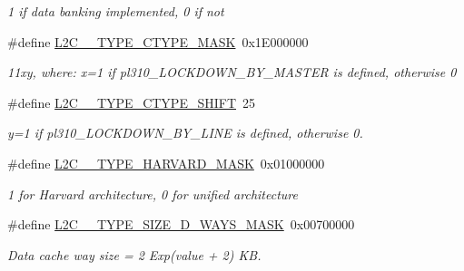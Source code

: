 \begin{DoxyCompactItemize}
\begin{DoxyCompactList}\small\item\em 1 if data banking implemented, 0 if not \end{DoxyCompactList}\item 
\mbox{\label{group__L2C-310__cache_gab3e4bbf537dd9b0520100b3c939e0302}} 
\#define \mbox{\hyperlink{group__L2C-310__cache_gab3e4bbf537dd9b0520100b3c939e0302}{L2\+C\+\_\+\_\+\+T\+Y\+P\+E\+\_\+\+C\+T\+Y\+P\+E\+\_\+\+M\+A\+SK}}~0x1\+E000000
\begin{DoxyCompactList}\small\item\em 11xy, where\+: x=1 if pl310\+\_\+\+L\+O\+C\+K\+D\+O\+W\+N\+\_\+\+B\+Y\+\_\+\+M\+A\+S\+T\+ER is defined, otherwise 0 \end{DoxyCompactList}\item 
\mbox{\label{group__L2C-310__cache_gaea11f2aa0d3382d07500a54f0a64d0ce}} 
\#define \mbox{\hyperlink{group__L2C-310__cache_gaea11f2aa0d3382d07500a54f0a64d0ce}{L2\+C\+\_\+\_\+\+T\+Y\+P\+E\+\_\+\+C\+T\+Y\+P\+E\+\_\+\+S\+H\+I\+FT}}~25
\begin{DoxyCompactList}\small\item\em y=1 if pl310\+\_\+\+L\+O\+C\+K\+D\+O\+W\+N\+\_\+\+B\+Y\+\_\+\+L\+I\+NE is defined, otherwise 0. \end{DoxyCompactList}\item 
\mbox{\label{group__L2C-310__cache_ga9383671eda6cfdb392ce71f6decab0af}} 
\#define \mbox{\hyperlink{group__L2C-310__cache_ga9383671eda6cfdb392ce71f6decab0af}{L2\+C\+\_\+\_\+\+T\+Y\+P\+E\+\_\+\+H\+A\+R\+V\+A\+R\+D\+\_\+\+M\+A\+SK}}~0x01000000
\begin{DoxyCompactList}\small\item\em 1 for Harvard architecture, 0 for unified architecture \end{DoxyCompactList}\item 
\mbox{\label{group__L2C-310__cache_ga76dd9bd6a2986018b8f88c7f5a005c3b}} 
\#define \mbox{\hyperlink{group__L2C-310__cache_ga76dd9bd6a2986018b8f88c7f5a005c3b}{L2\+C\+\_\+\_\+\+T\+Y\+P\+E\+\_\+\+S\+I\+Z\+E\+\_\+\+D\+\_\+\+W\+A\+Y\+S\+\_\+\+M\+A\+SK}}~0x00700000
\begin{DoxyCompactList}\small\item\em Data cache way size = 2 Exp(value + 2) KB. \end{DoxyCompactList}\item 

\end{DoxyCompactItemize}
